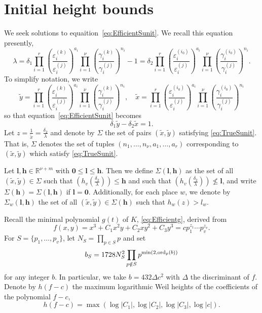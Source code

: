 \section{Initial height bounds}
\label{sec:InitialHeightBounds}

We seek solutions to equaition~\eqref{eq:EfficientSunit}. We recall this equation presently, 
\begin{equation*}
\lambda = \delta_1 \prod_{i = 1}^r\left( \frac{\varepsilon_i^{(k)}}{\varepsilon_i^{(j)}}\right)^{a_i}\prod_{i = 1}^{\nu} \left( \frac{\gamma_i^{(k)}}{\gamma_i^{(j)}}\right)^{n_i} - 1 = \delta_2 \prod_{i = 1}^{r}\left( \frac{\varepsilon_i^{(i_0)}}{\varepsilon_i^{(j)}}\right)^{a_i} \prod_{i = 1}^{\nu} \left( \frac{\gamma_i^{(i_0)}}{\gamma_i^{(j)}}\right)^{n_i}.
\end{equation*}
To simplify notation, we write
\[\tilde{y} =  \prod_{i = 1}^r\left( \frac{\varepsilon_i^{(k)}}{\varepsilon_i^{(j)}}\right)^{a_i}\prod_{i = 1}^{\nu} \left( \frac{\gamma_i^{(k)}}{\gamma_i^{(j)}}\right)^{n_i}, \quad 
\tilde{x} = \prod_{i = 1}^{r}\left( \frac{\varepsilon_i^{(i_0)}}{\varepsilon_i^{(j)}}\right)^{a_i} \prod_{i = 1}^{\nu} \left( \frac{\gamma_i^{(i_0)}}{\gamma_i^{(j)}}\right)^{n_i}\]
so that equation~\eqref{eq:EfficientSunit} becomes
\begin{equation} \label{eq:TrueSunit}
\delta_1\tilde{y} - \delta_2\tilde{x} = 1.
\end{equation}
Let $z= \frac{1}{\tilde{x}} = \frac{\delta_2}{\lambda}$ and denote by $\Sigma$ the set of pairs $(\tilde{x},\tilde{y})$ satisfying \eqref{eq:TrueSunit}. That is, $\Sigma$ denotes the set of tuples $(n_1, \dots, n_{\nu}, a_1, \dots, a_r)$ corresponding to $(\tilde{x},\tilde{y})$ which satisfy \eqref{eq:TrueSunit}.

Let $\mathbf{l},\mathbf{h}\in\mathbb{R}^{\nu + m}$ with $\mathbf{0}\leq \mathbf{l}\leq \mathbf{h}$. Then we define $\Sigma(\mathbf{l},\mathbf{h})$ as the set of all $(\tilde{x},\tilde{y}) \in \Sigma$ such that $\left(h_v\left(\frac{\delta_2}{\lambda}\right)\right)\leq \mathbf{h}$ and such that $\left(h_v\left(\frac{\delta_2}{\lambda}\right)\right)\nleq \mathbf{l}$, and write $\Sigma(\mathbf{h})=\Sigma(\mathbf{l},\mathbf{h})$ if $\mathbf{l}=\mathbf{0}$. Additionally, for each place $w$, we denote by $\Sigma_w(\mathbf{l},\mathbf{h})$ the set of all $(\tilde{x},\tilde{y})\in\Sigma(\mathbf{h})$ such that $h_w(z)>l_w$. 

Recall the minimal polynomial $g(t)$ of $K$, \eqref{eq:Efficientg}, derived from 
\[f(x,y) = x^3 + C_1 x^{2}y + C_2xy^2 + C_3y^3 = cp_1^{z_1}\cdots p_v^{z_v}.\]
For $S = \{p_1, \dots, p_v\}$, let $N_S = \prod_{p\in S}p$ and set 
\[b_S	 = 1728 N_S^2 \prod_{p \notin S} p^{\min(2,\operatorname{ord}_p(b))}\]
for any integer $b$. In particular, we take $b = 432 \Delta c^2$ with $\Delta$ the discriminant of $f$. Denote by $h(f-c)$ the maximum logarithmic Weil heights of the coefficients of the polynomial $f - c$,
\[h(f-c) = \max(\log|C_1|, \log|C_2|, \log|C_3|, \log|c|).\]

